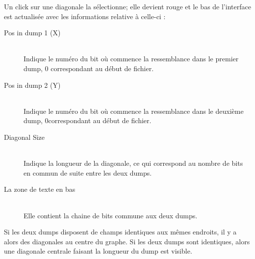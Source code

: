 Un click sur une diagonale la sélectionne; elle devient rouge et le bas de l'interface est actualisée avec les informations relative à celle-ci :
\begin{description}
\item[Pos in dump 1 (X)] \hfill \\
	Indique le numéro du bit où commence la ressemblance dans le premier dump, 0 correspondant au début de fichier.
	
\item[Pos in dump 2 (Y)] \hfill \\
	Indique le numéro du bit où commence la ressemblance dans le deuxième dump, 0correspondant au début de fichier.

\item[Diagonal Size] \hfill \\
	Indique la longueur de la diagonale, ce qui correspond au nombre de bits en commun de suite entre les deux dumps.
	
\item[La zone de texte en bas] \hfill \\
	Elle contient la chaine de bits commune aux deux dumps.

\end{description}

Si les deux dumps disposent de champs identiques aux mêmes endroits, il y a alors des diagonales au centre du graphe. Si les deux dumps sont identiques, alors une diagonale centrale faisant la longueur du dump est visible.